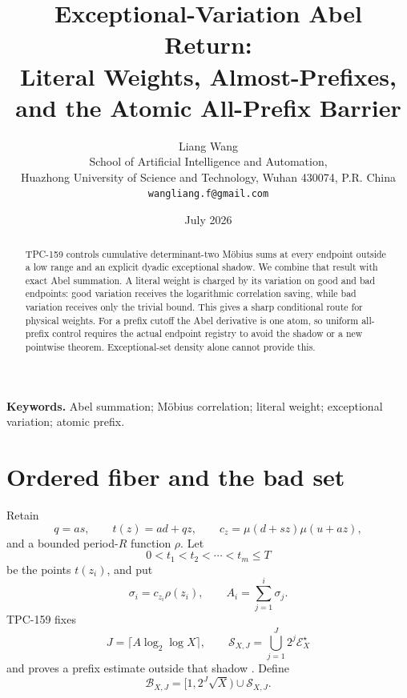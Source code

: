 \documentclass[11pt]{article}
\title{\textbf{Exceptional-Variation Abel Return:\\
Literal Weights, Almost-Prefixes, and the Atomic All-Prefix Barrier}}
\author{Liang Wang\\
\small School of Artificial Intelligence and Automation,\\[-2pt]
\small Huazhong University of Science and Technology, Wuhan 430074, P.R. China\\
\small \texttt{wangliang.f@gmail.com}}
\date{July 2026}
\theoremstyle{definition}
\newcommand{\E}{\mathcal E}
\newcommand{\Bbad}{\mathcal B}
\newcommand{\Sshadow}{\mathcal S}
\begin{document}
\maketitle

\begin{abstract}
TPC-159 controls cumulative determinant-two M\"obius sums at every
endpoint outside a low range and an explicit dyadic exceptional
shadow.  We combine that result with exact Abel summation.  A literal
weight is charged by its variation on good and bad endpoints:
good variation receives the logarithmic correlation saving, while
bad variation receives only the trivial bound.  This gives a sharp
conditional route for physical weights.  For a prefix cutoff the
Abel derivative is one atom, so uniform all-prefix control requires
the actual endpoint registry to avoid the shadow or a new pointwise
theorem.  Exceptional-set density alone cannot provide this.
\end{abstract}

\noindent\textbf{Keywords.}
Abel summation; M\"obius correlation; literal weight; exceptional
variation; atomic prefix.

\medskip
\noindent{}

\section{Ordered fiber and the bad set}

Retain
\[
 q=as,\qquad t(z)=ad+qz,\qquad
 c_z=\mu(d+sz)\mu(u+az),
\]
and a bounded period-\(R\) function \(\rho\).
Let
\[
 0<t_1<t_2<\cdots<t_m\le T
\]
be the points \(t(z_i)\), and put
\[
 \sigma_i=c_{z_i}\rho(z_i),\qquad
 A_i=\sum_{j=1}^i\sigma_j.
\]
TPC-159 fixes
\[
 J=\lceil A\log_2\log X\rceil,\qquad
 \Sshadow_{X,J}=\bigcup_{j=1}^J2^j\E_X^\star
\]
and proves a prefix estimate outside that shadow
\citep{WangTPC159}.  Define
\begin{equation}
 \Bbad_{X,J}=[1,2^J\sqrt X)\cup\Sshadow_{X,J}.
\label{eq:bad}
\end{equation}
\end{document}
